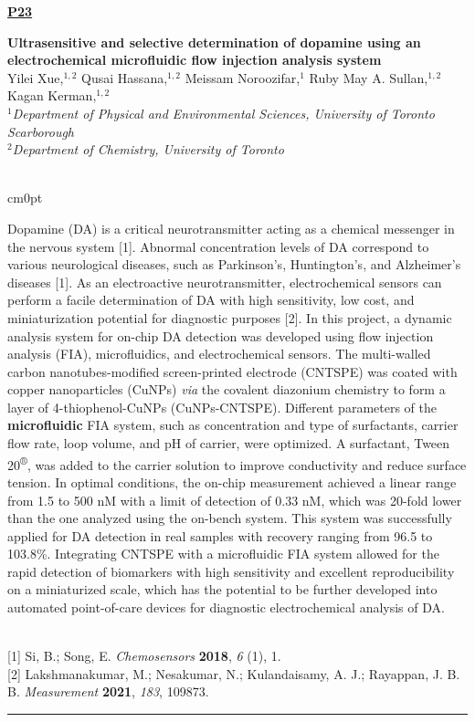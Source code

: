 \documentclass[titlepage,oneside,openany,10pt]{book}
\newenvironment{posterabswrefwfig}[8] %
        {
        \newcommand{\posterref}{#5}
	\FPeval{\cutw}{clip(16.7-#7)}
	\FPeval{\cutl}{round(#8/0.35+1,3)}
	\begin{flushright}
                \underline{\textbf{#4}}
        \end{flushright}
        \textbf{#1}\\%
        #2\\%
        \textit{#3}\\\\%
        \def\windowpagestuff{\centering
                \texttt{[image: \#6]}
	}
        \opencutright
        \begin{cutout}{0}{\cutw cm}{0pt}{\RoundingUpFunction{\cutl}}
        \noindent
	}
	{
	\end{cutout}
	\vspace{0.5cm}
	\\\noindent \posterref \\ \noindent\rule{15cm}{0.5pt}%
        }
\begin{document}
\newpage

\begin{posterabswrefwfig}
	{Ultrasensitive and selective determination of dopamine using an electrochemical microfluidic flow injection analysis system}
	{Yilei Xue,$^{1,2}$ Qusai Hassana,$^{1,2}$ Meissam Noroozifar,$^{1}$ Ruby May A. Sullan,$^{1,2}$ Kagan Kerman,$^{1,2}$}
	{
	$^1$Department of Physical and Environmental Sciences, University of Toronto Scarborough\\
	$^2$Department of Chemistry, University of Toronto
	}
	{P23}
	{
	{[1]} Si, B.; Song, E. \emph{Chemosensors}  \textbf{2018}, \emph{6} (1), 1.\\
	{[2]} Lakshmanakumar, M.; Nesakumar, N.; Kulandaisamy, A. J.; Rayappan, J. B. B. \emph{Measurement}  \textbf{2021}, \emph{183}, 109873.
	}
	{abstract_figures/Xue_Yilei_Oral.png}
	{10.0}
	{4.0}
	Dopamine (DA) is a critical neurotransmitter acting as a chemical messenger in the nervous system {[}1{]}. Abnormal concentration levels of DA correspond to various neurological diseases, such as Parkinson's, Huntington's, and Alzheimer's diseases {[}1{]}. As an electroactive neurotransmitter, electrochemical sensors can perform a facile determination of DA with high sensitivity, low cost, and miniaturization potential for diagnostic purposes {[}2{]}. In this project, a dynamic analysis system for on-chip DA detection was developed using flow injection analysis (FIA), microfluidics, and electrochemical sensors. The multi-walled carbon nanotubes-modified screen-printed electrode (CNTSPE) was coated with copper nanoparticles (CuNPs) \emph{via} the covalent diazonium chemistry to form a layer of 4-thiophenol-CuNPs (CuNPs-CNTSPE). Different parameters of the \textbf{microfluidic} FIA system, such as concentration and type of surfactants, carrier flow rate, loop volume, and pH of carrier, were optimized. A surfactant, Tween 20\textsuperscript{®}, was added to the carrier solution to improve conductivity and reduce surface tension. In optimal conditions, the on-chip measurement achieved a linear range from 1.5 to 500 nM with a limit of detection of 0.33 nM, which was 20-fold lower than the one analyzed using the on-bench system. This system was successfully applied for DA detection in real samples with recovery ranging from 96.5 to 103.8\%. Integrating CNTSPE with a microfluidic FIA system allowed for the rapid detection of biomarkers with high sensitivity and excellent reproducibility on a miniaturized scale, which has the potential to be further developed into automated point-of-care devices for diagnostic electrochemical analysis of DA.
	\label{XueY}
\end{posterabswrefwfig}
\end{document}
